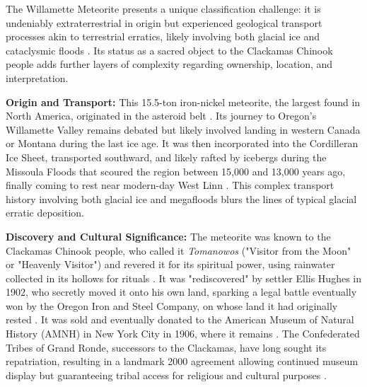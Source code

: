 The Willamette Meteorite presents a unique classification challenge: it is undeniably extraterrestrial in origin but experienced geological transport processes akin to terrestrial erratics, likely involving both glacial ice and cataclysmic floods \cite{AMNHWillamette, Pasek2008}. Its status as a sacred object to the Clackamas Chinook people adds further layers of complexity regarding ownership, location, and interpretation.

\textbf{Origin and Transport:} This 15.5-ton iron-nickel meteorite, the largest found in North America, originated in the asteroid belt \cite{AMNHWillamette}. Its journey to Oregon's Willamette Valley remains debated but likely involved landing in western Canada or Montana during the last ice age. It was then incorporated into the Cordilleran Ice Sheet, transported southward, and likely rafted by icebergs during the Missoula Floods that scoured the region between 15,000 and 13,000 years ago, finally coming to rest near modern-day West Linn \cite{Pasek2008, Bretz1969}. This complex transport history involving both glacial ice and megafloods blurs the lines of typical glacial erratic deposition.

\textbf{Discovery and Cultural Significance:} The meteorite was known to the Clackamas Chinook people, who called it \emph{Tomanowos} ("Visitor from the Moon" or "Heavenly Visitor") and revered it for its spiritual power, using rainwater collected in its hollows for rituals \cite{statesmanjournalPiecesSacred, ourtimebdTomanowosMeteorite}. It was "rediscovered" by settler Ellis Hughes in 1902, who secretly moved it onto his own land, sparking a legal battle eventually won by the Oregon Iron and Steel Company, on whose land it had originally rested \cite{AMNHWillamette}. It was sold and eventually donated to the American Museum of Natural History (AMNH) in New York City in 1906, where it remains \cite{AMNHWillamette}. The Confederated Tribes of Grand Ronde, successors to the Clackamas, have long sought its repatriation, resulting in a landmark 2000 agreement allowing continued museum display but guaranteeing tribal access for religious and cultural purposes \cite{statesmanjournalPiecesSacred, ourtimebdTomanowosMeteorite}.

